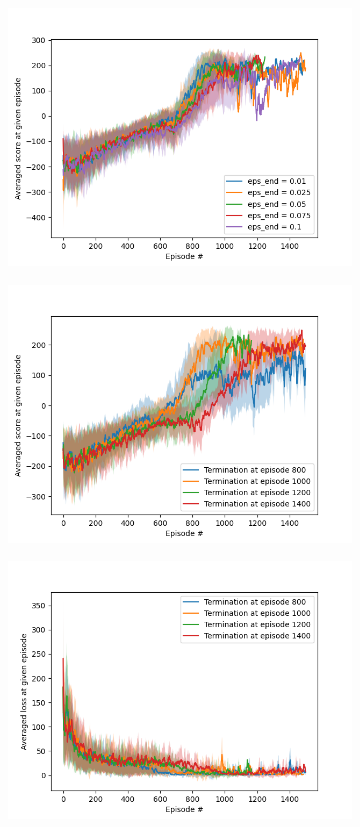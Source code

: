 \documentclass{article}
\begin{document}
\begin{figure}[H]
\begin{subfigure}{0.5\linewidth}
        \includegraphics[width=\linewidth]{figs/EPS_END.png}
    \end{subfigure}
    \quad
    \begin{subfigure}{0.5\linewidth}
        \centering
        \includegraphics[width=\linewidth]{figs/EPS_TERM.png}
    \end{subfigure}
    \begin{subfigure}{0.5\linewidth}
        \centering
        \includegraphics[width=\linewidth]{figs/EPS_TERM(loss).png}

\end{subfigure}
\end{figure}
\end{document}

